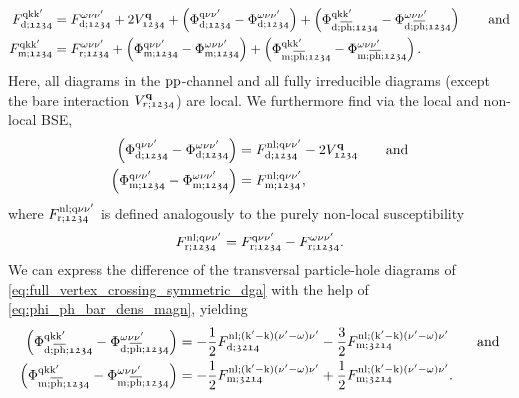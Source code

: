 \documentclass[../../main.tex]{subfiles}
\begin{document}
\begin{align}\label{eq:full_vertex_crossing_symmetric_dga}
	F^{\text{q}\text{k}\text{k}'}_{\text{d};\mathfrak{1234}}&=F^{\omega\nu\nu'}_{\text{d};\mathfrak{1234}}+2 V_{\mathfrak{1234}}^{\textbf{q}}+\left (\Phi^{\text{q}\nu\nu'}_{\text{d};\mathfrak{1234}}-\Phi^{\omega\nu\nu'}_{\text{d};\mathfrak{1234}}\right )+\left (\Phi^{\text{q}\text{k}\text{k}'}_{\text{d};\overline{\text{ph}};\mathfrak{1234}}-\Phi^{\omega\nu\nu'}_{\text{d};\overline{\text{ph}};\mathfrak{1234}}\right )\qquad\text{and}\\
	F^{\text{q}\text{k}\text{k}'}_{\text{m};\mathfrak{1234}}&=F^{\omega\nu\nu'}_{\text{r};\mathfrak{1234}}+\left (\Phi^{\text{q}\nu\nu'}_{\text{m};\mathfrak{1234}}-\Phi^{\omega\nu\nu'}_{\text{m};\mathfrak{1234}}\right )+\left (\Phi^{\text{q}\text{k}\text{k}'}_{\text{m};\overline{\text{ph}};\mathfrak{1234}}-\Phi^{\omega\nu\nu'}_{\text{m};\overline{\text{ph}};\mathfrak{1234}}\right ).
\end{align}
Here, all diagrams in the $\text{pp}$-channel and all fully irreducible diagrams (except the bare interaction $V^{\textbf{q}}_{r;\mathfrak{1234}}$) are local. We furthermore find via the local and non-local BSE,
\begin{subequations}
\begin{align}
	\left (\Phi^{\text{q}\nu\nu'}_{\text{d};\mathfrak{1234}}-\Phi^{\omega\nu\nu'}_{\text{d};\mathfrak{1234}}\right )&=F_{\text{d};\mathfrak{1234}}^{\text{nl};\text{q}\nu\nu'}-2 V^{\textbf{q}}_{\mathfrak{1234}}\qquad\text{and}\\
	\left (\Phi^{\text{q}\nu\nu'}_{\text{m};\mathfrak{1234}}-\Phi^{\omega\nu\nu'}_{\text{m};\mathfrak{1234}}\right )&=F_{\text{m};\mathfrak{1234}}^{\text{nl};\text{q}\nu\nu'},
\end{align}
\end{subequations}
where $F_{\text{r};\mathfrak{1234}}^{\text{nl};\text{q}\nu\nu'}$ is defined analogously to the purely non-local susceptibility 
\begin{align}
	F_{\text{r};\mathfrak{1234}}^{\text{nl};\text{q}\nu\nu'}=F_{\text{r};\mathfrak{1234}}^{\text{q}\nu\nu'}-F_{\text{r};\mathfrak{1234}}^{\omega\nu\nu'}.
\end{align}
We can express the difference of the transversal particle-hole diagrams of \eqref{eq:full_vertex_crossing_symmetric_dga} with the help of  \eqref{eq:phi_ph_bar_dens_magn}, yielding
\begin{subequations}
\begin{align}
	\left (\Phi^{\text{q}\text{k}\text{k}'}_{\text{d};\overline{\text{ph}};\mathfrak{1234}}-\Phi^{\omega\nu\nu'}_{\text{d};\overline{\text{ph}};\mathfrak{1234}}\right )&=-\frac12 F_{\text{d};\mathfrak{3214}}^{\text{nl};(\text{k}'-\text{k})(\nu'-\omega)\nu'}-\frac32 F_{\text{m};\mathfrak{3214}}^{\text{nl};(\text{k}'-\text{k})(\nu'-\omega)\nu'}\qquad\text{and}\\
	\left (\Phi^{\text{q}\text{k}\text{k}'}_{\text{m};\overline{\text{ph}};\mathfrak{1234}}-\Phi^{\omega\nu\nu'}_{\text{m};\overline{\text{ph}};\mathfrak{1234}}\right )&=-\frac12 F_{\text{m};\mathfrak{3214}}^{\text{nl};(\text{k}'-\text{k})(\nu'-\omega)\nu'}+\frac12 F_{\text{m};\mathfrak{3214}}^{\text{nl};(\text{k}'-\text{k})(\nu'-\omega)\nu'}.
\end{align}
\end{subequations}
\end{document}
